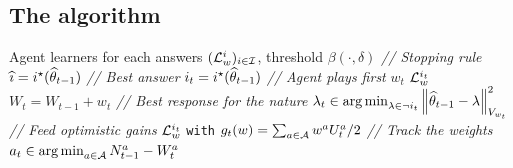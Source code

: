 

\subsection{The \LG{} algorithm}

\begin{algorithm}[ht]
\centering
\caption{\LG}
\label{alg:lg}
\begin{algorithmic}[1]
     Agent learners for each answers $(\mathcal{L}^i_w)_{i\in\mathcal{I}}$, threshold $\beta(\cdot,\delta)$
        \State \textit{// Stopping rule}
            \State {} 
             $\widehat{\imath} = i^\star(\widehat{\theta}_{t-1})$
        \EndIf
        \State \textit{// Best answer}
        \State $i_{t} = i^\star(\widehat{\theta}_{t-1})$
        \State \textit{// Agent plays first}
        \State {} $w_{t}$  $\mathcal{L}^{i_t}_w$
        \State {} $W_{t}=W_{t-1}+w_{t}$
        \State \textit{// Best response for the nature}
        \State $\lambda_{t} \in \operatorname*{arg\,min}_{\lambda\in\neg i_t}\left\lVert\widehat{\theta}_{t-1}-\lambda\right\rVert^2_{V_{w_{t}}}$
        \State \textit{// Feed optimistic gains}
        \State {} $\mathcal{L}_w^{i_{t}}$ \texttt{with} $g_{t}(w) = \sum_{a\in\mathcal{A}}w^a U_t^a/2$
        \State \textit{// Track the weights}
        \State {} $a_{t}\in \operatorname*{arg\,min}_{a\in \mathcal A } N_{t-1}^{a} - W_{t}^{a}$
   \EndFor
\end{algorithmic}
\end{algorithm}

